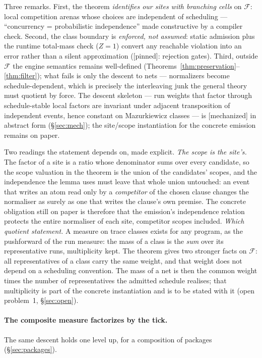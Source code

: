 \documentclass[11pt]{article}
\newcommand{\cclass}{\mathcal{F}}                  %
\newcommand{\stmech}{[\textsf{mechanized}]}
\newcommand{\stpinned}{[\textsf{pinned}]}
\theoremstyle{plain}
\theoremstyle{definition}
\theoremstyle{remark}
\begin{document}
Three remarks. First, the theorem \emph{identifies our sites with
branching cells} on $\cclass$: local competition arenas whose choices
are independent of scheduling --- ``concurrency = probabilistic
independence'' made constructive by a compiler check. Second, the class
boundary is \emph{enforced, not assumed}: static admission plus the
runtime total-mass check ($Z = 1$) convert any reachable violation into
an error rather than a silent approximation (\stpinned{}: rejection
gates). Third, outside $\cclass$ the engine semantics remains
well-defined (Theorems~\ref{thm:preservation}--\ref{thm:filter}); what
fails is only the descent to nets --- normalizers become
schedule-dependent, which is precisely the interleaving junk the
general theory must quotient by force. The descent skeleton --- run
weights that factor through schedule-stable local factors are invariant
under adjacent transposition of independent events, hence constant on
Mazurkiewicz classes --- is \stmech{} in abstract form
(\S\ref{sec:mech}); the site/scope instantiation for the concrete
emission remains on paper.

Two readings the statement depends on, made explicit. \emph{The scope
is the site's.} The factor of a site is a ratio whose denominator sums
over every candidate, so the scope valuation in the theorem is the
union of the candidates' scopes, and the independence the lemma uses
must leave that whole union untouched: an event that writes an atom
read only by a \emph{competitor} of the chosen clause changes the
normaliser as surely as one that writes the clause's own premise. The
concrete obligation still on paper is therefore that the emission's
independence relation protects the entire normaliser of each site,
competitor scopes included. \emph{Which quotient statement.} A measure
on trace classes exists for any program, as the pushforward of the run
measure: the mass of a class is the \emph{sum} over its representative
runs, multiplicity kept. The theorem gives two stronger facts on
$\cclass$: all representatives of a class carry the same weight, and
that weight does not depend on a scheduling convention. The mass of a
net is then the common weight times the number of representatives the
admitted schedule realises; that multiplicity is part of the concrete
instantiation and is to be stated with it (open problem~1,
\S\ref{sec:open}).


\paragraph{The composite measure factorizes by the tick.} The same
descent holds one level up, for a composition of packages
(\S\ref{sec:packages}).
\end{document}
